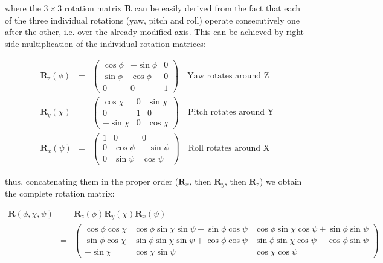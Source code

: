 \documentclass[a4paper,11pt]{report}
\begin{document}
\noindent where the $3 \times 3$ rotation matrix $\mathbf{R}$ can be easily derived 
from the fact that each of the three individual rotations (yaw, pitch and roll) operate
consecutively one after the other, i.e. over the already modified axis. 
This can be achieved by right-side multiplication of the individual rotation matrices:

\begin{eqnarray}
\mathbf{R}_z(\phi) &=& 
\left(
\begin{array}{ccc}
\cos \phi & -\sin \phi & 0 \\
\sin \phi & \cos \phi & 0 \\
0 & 0 & 1
\end{array}
\right) \quad \mathrm{\text{Yaw rotates around Z}} \\
\mathbf{R}_y(\chi) &= &
\left(
\begin{array}{ccc}
\cos \chi & 0 & \sin \chi \\
0 & 1 & 0 \\
-\sin \chi & 0 & \cos \chi
\end{array}
\right) \quad \mathrm{\text{Pitch rotates around Y}} \\
\mathbf{R}_x(\psi) &=& 
\left(
\begin{array}{ccc}
1 & 0 & 0 \\
0 & \cos \psi & -\sin \psi \\
0 & \sin \psi &  \cos \psi 
\end{array}
\right) \quad \mathrm{\text{Roll rotates around X}} 
\end{eqnarray}

\noindent thus, concatenating them in the proper order ($\mathbf{R}_x$, then $\mathbf{R}_y$, then $\mathbf{R}_z$)
we obtain the complete rotation matrix:

\begin{eqnarray}
\mathbf{R}(\phi,\chi,\psi) &=&  \mathbf{R}_z(\phi) \mathbf{R}_y(\chi) \mathbf{R}_x(\psi) 
\label{eq:mat_ypr} \\
&=& 
\left(
\begin{array}{ccc}
\cos \phi \cos \chi  & \cos \phi \sin \chi \sin \psi - \sin \phi \cos \psi   & \cos \phi \sin \chi \cos \psi + \sin \phi \sin \psi \\
\sin \phi \cos \chi  & \sin \phi \sin \chi \sin \psi + \cos \phi \cos \psi  &  \sin \phi \sin \chi \cos \psi - \cos \phi \sin \psi \\
-\sin \chi & \cos \chi \sin \psi  &  \cos \chi \cos \psi
\end{array}
\right) \nonumber
\end{eqnarray}
\end{document}
